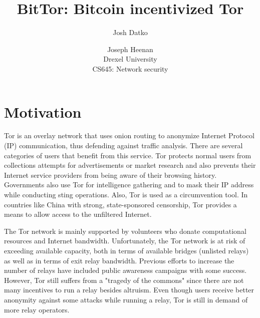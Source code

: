 \documentclass[letterpaper]{article}
\begin{document}
\setcounter{secnumdepth}{1}
\title{BitTor: Bitcoin incentivized Tor}
\author{Josh Datko \and Joseph Heenan\\ Drexel University\\
CS645: Network security\\
}
\maketitle

\section*{Motivation}\label{sec:motivation}
Tor is an overlay network that uses onion routing to anonymize
Internet Protocol (IP) communication, thus defending against traffic
analysis.  There are several categories of users that benefit from
this service.  Tor protects normal users from collections attempts for
advertisements or market research and also prevents their Internet
service providers from being aware of their browsing history.
Governments also use Tor for intelligence gathering and to mask their
IP address while conducting sting operations.  Also, Tor is used as a
circumvention tool\cite{tor-internet-days}.  In countries like China
with strong, state-sponsored censorship\cite{china-censorship}, Tor
provides a means to allow access to the unfiltered Internet.

The Tor network is mainly supported by volunteers who donate
computational resources and Internet bandwidth.  Unfortunately, the
Tor network is at risk of exceeding available capacity, both in terms
of available bridges (unlisted relays) as well as in terms of exit
relay bandwidth\cite{tor-internet-days}.  Previous efforts to increase
the number of relays have included public awareness
campaigns\cite{eff-campaign} with some success.  However, Tor still
suffers from a "tragedy of the commons\cite{Hardin_1968_Commons}"
since there are not many incentives to run a relay besides altruism.
Even though users receive better anonymity against some attacks while
running a relay\cite{better-anon-tor-relay}, Tor is still in demand of
more relay operators.
\end{document}
